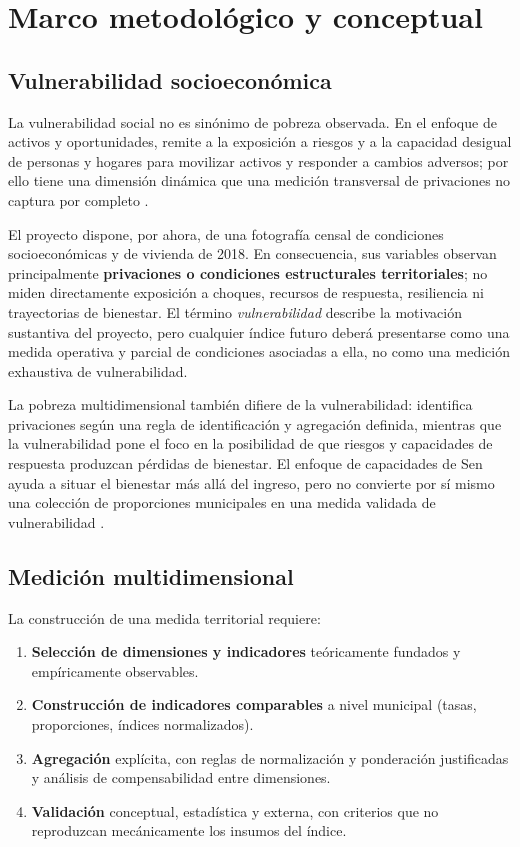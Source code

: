 \section{Marco metodológico y conceptual}
\label{ch:marco_conceptual}

\subsection{Vulnerabilidad socioeconómica}
\label{sec:vulnerabilidad}

La vulnerabilidad social no es sinónimo de pobreza observada. En el enfoque de activos y oportunidades, remite a la exposición a riesgos y a la capacidad desigual de personas y hogares para movilizar activos y responder a cambios adversos; por ello tiene una dimensión dinámica que una medición transversal de privaciones no captura por completo \citep{kaztman1999activos, pizarro2001vulnerabilidad}.

El proyecto dispone, por ahora, de una fotografía censal de condiciones socioeconómicas y de vivienda de 2018. En consecuencia, sus variables observan principalmente \textbf{privaciones o condiciones estructurales territoriales}; no miden directamente exposición a choques, recursos de respuesta, resiliencia ni trayectorias de bienestar. El término \textit{vulnerabilidad} describe la motivación sustantiva del proyecto, pero cualquier índice futuro deberá presentarse como una medida operativa y parcial de condiciones asociadas a ella, no como una medición exhaustiva de vulnerabilidad.

La pobreza multidimensional también difiere de la vulnerabilidad: identifica privaciones según una regla de identificación y agregación definida, mientras que la vulnerabilidad pone el foco en la posibilidad de que riesgos y capacidades de respuesta produzcan pérdidas de bienestar. El enfoque de capacidades de Sen ayuda a situar el bienestar más allá del ingreso, pero no convierte por sí mismo una colección de proporciones municipales en una medida validada de vulnerabilidad \citep{sen1999development, alkire2011multidimensional}.

\subsection{Medición multidimensional}
\label{sec:medicion_multidimensional}

La construcción de una medida territorial requiere:

\begin{enumerate}
    \item \textbf{Selección de dimensiones y indicadores} teóricamente fundados y empíricamente observables.
    \item \textbf{Construcción de indicadores comparables} a nivel municipal (tasas, proporciones, índices normalizados).
    \item \textbf{Agregación} explícita, con reglas de normalización y ponderación justificadas y análisis de compensabilidad entre dimensiones.
    \item \textbf{Validación} conceptual, estadística y externa, con criterios que no reproduzcan mecánicamente los insumos del índice.
\end{enumerate}

